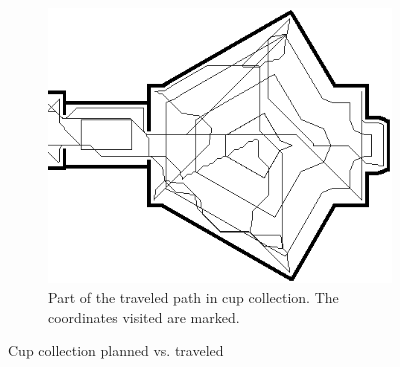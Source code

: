 \begin{figure}[ht]
\begin{subfigure}[t]{0.3\textwidth}
    \includegraphics[width = \textwidth]{graphics/cup_collect_robot}
    \caption{Part of the traveled path in cup collection. The coordinates visited are marked.}
    \label{cup_collect_robot}
  \end{subfigure}
\caption{Cup collection planned vs. traveled}
\label{cup_collection_results}
\end{figure}